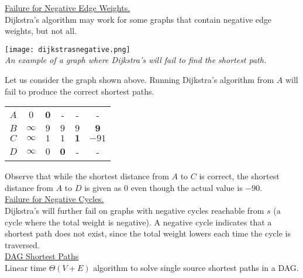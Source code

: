 \documentclass[12pt, fleqn]{general}
\begin{document}
\begin{multicols*}{2}
    \underline{Failure for Negative Edge Weights.}\\
    
    Dijkstra's algorithm may work for some graphs that contain negative edge weights, but not all. \\

    \begin{center}
    \texttt{[image: dijkstrasnegative.png]}\\
    \emph{An example of a graph where Dijkstra's will fail to find the shortest path.}
    \end{center}

    Let us consider the graph shown above. Running Dijkstra's algorithm from $A$ will fail to produce the correct shortest paths.

    \begin{center}
        \begin{tabular}{|c| c c c c c|}\hline
        $A$&$0$&$\mathbf{0}$&-&-&-\\
        $B$&$\infty$&$9$&$9$&$9$&$\mathbf{9}$\\
        $C$&$\infty$&$1$&$1$&$\mathbf{1}$&$-91$\\
        $D$&$\infty$&$0$&$\mathbf{0}$&-&-\\\hline
        \end{tabular}
    \end{center}

    Observe that while the shortest distance from $A$ to $C$ is correct, the shortest distance from $A$ to $D$ is given as $0$ even though the actual value is $-90$.\\

    \underline{Failure for Negative Cycles.}\\

    Dijkstra's will further fail on graphs with negative cycles reachable from $s$ (a cycle where the total weight is negative). A negative cycle indicates that a shortest path does not exist, since the total weight lowers each time the cycle is traversed.\\


    {\large \underline{DAG Shortest Paths}}\\

    Linear time $\Theta(V + E)$ algorithm to solve single source shortest paths in a DAG.\\


\end{multicols*}
\end{document}
